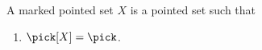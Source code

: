 

\begin{struct}\label{marked_pointed_set}
    A marked pointed set $X$ is a pointed set such that
    \begin{enumerate}
        \item\label{marked_pointed_refl} $\pick[X] = \pick$.
    \end{enumerate}
\end{struct}

